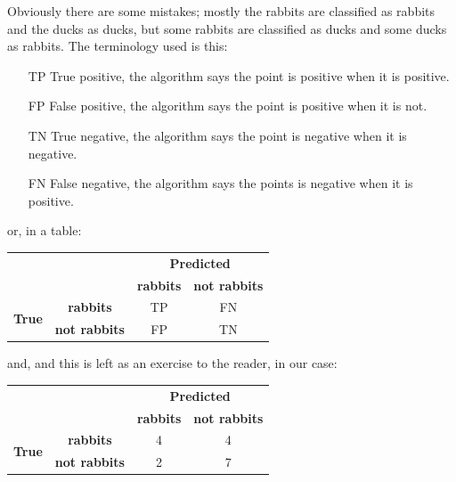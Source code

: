 \documentclass[12pt]{article}
\begin{document}
Obviously there are some mistakes; mostly the rabbits are classified
as rabbits and the ducks as ducks, but some rabbits are classified as
ducks and some ducks as rabbits. The terminology used is this:
\begin{itemize}
\item[TP] True positive, the algorithm says the point is positive when it is positive.
\item[FP] False positive, the algorithm says the point is positive when it is not.
\item[TN] True negative, the algorithm says the point is negative when it is negative.
\item[FN] False negative, the algorithm says the points is negative when it is positive.
\end{itemize}
or, in a table:
\begin{center}
\begin{tabular}{|c|c|c|c|}
\cline{3-4}
\multicolumn{1}{c}{}&\multicolumn{1}{c|}{}&\multicolumn{2}{c|}{\textbf{Predicted}} \\ \cline{3-4} 
\multicolumn{1}{c}{}&\multicolumn{1}{c|}{}& \textbf{rabbits} & \textbf{not rabbits} \\ \hline
\multirow{2}{*}{\textbf{True}}&
\textbf{rabbits} & TP & FN \\ \cline{2-4}
&\textbf{not rabbits} & FP & TN \\ \cline{1-4}
\end{tabular}
  \end{center}
and, and this is left as an exercise to the reader, in our case:
\begin{center}
\begin{tabular}{|c|c|c|c|}
\cline{3-4}
\multicolumn{1}{c}{}&\multicolumn{1}{c|}{}&\multicolumn{2}{c|}{\textbf{Predicted}} \\ \cline{3-4} 
\multicolumn{1}{c}{}&\multicolumn{1}{c|}{}& \textbf{rabbits} & \textbf{not rabbits} \\ \hline
\multirow{2}{*}{\textbf{True}}&
\textbf{rabbits} & 4 & 4 \\ \cline{2-4}
&\textbf{not rabbits} & 2 & 7 \\ \cline{1-4}
\end{tabular}
\end{center}
\end{document}
